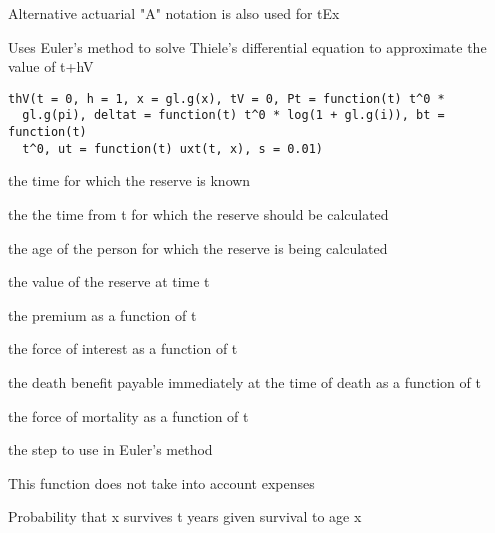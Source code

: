 \documentclass[a4paper]{book}
\begin{document}
%
\begin{Details}\relax
Alternative actuarial "A" notation is also used for tEx
\end{Details}
%
\begin{Description}\relax
Uses Euler's method to solve Thiele's differential equation to approximate the value of t+hV
\end{Description}
%
\begin{Usage}
\begin{verbatim}
thV(t = 0, h = 1, x = gl.g(x), tV = 0, Pt = function(t) t^0 *
  gl.g(pi), deltat = function(t) t^0 * log(1 + gl.g(i)), bt = function(t)
  t^0, ut = function(t) uxt(t, x), s = 0.01)
\end{verbatim}
\end{Usage}
%
\begin{Arguments}
\begin{ldescription}
\item[\code{t}] the time for which the reserve is known

\item[\code{h}] the the time from t for which the reserve should be calculated

\item[\code{x}] the age of the person for which the reserve is being calculated

\item[\code{tV}] the value of the reserve at time t

\item[\code{Pt}] the premium as a function of t

\item[\code{deltat}] the force of interest as a function of t

\item[\code{bt}] the death benefit payable immediately at the time of death as a function of t

\item[\code{ut}] the force of mortality as a function of t

\item[\code{s}] the step to use in Euler's method
\end{ldescription}
\end{Arguments}
%
\begin{Details}\relax
This function does not take into account expenses
\end{Details}
%
\begin{Description}\relax
Probability that x survives t years given survival to age x
\end{Description}
\end{document}
